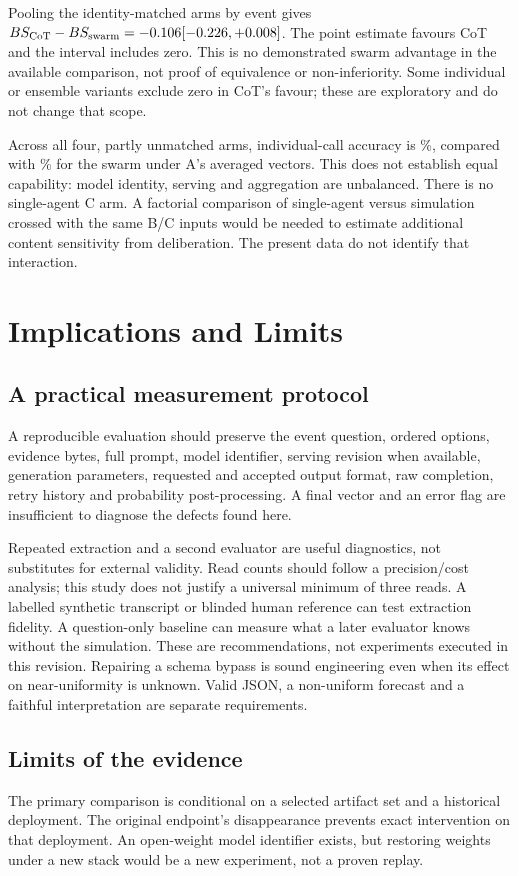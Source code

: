 \documentclass[10pt,conference]{IEEEtran}
\begin{document}
Pooling the identity-matched arms by event gives
$BS_{\rm CoT}-BS_{\rm swarm}=-0.106 [-0.226, +0.008]$. The point estimate favours CoT
and the interval includes zero. This is no demonstrated swarm advantage in
the available comparison, not proof of equivalence or non-inferiority.
Some individual or ensemble variants exclude zero in CoT's favour; these
are exploratory and do not change that scope.

Across all four, partly unmatched arms, individual-call accuracy is
\CotAccuracy\%, compared with \PooledAccuracy\% for the swarm under A's
averaged vectors. This does not establish equal capability: model identity,
serving and aggregation are unbalanced. There is no single-agent C arm.
A factorial comparison of single-agent versus simulation crossed with the
same B/C inputs would be needed to estimate additional content sensitivity
from deliberation. The present data do not identify that interaction.

\section{Implications and Limits}
\label{sec:limitations}
\subsection{A practical measurement protocol}
A reproducible evaluation should preserve the event question, ordered options,
evidence bytes, full prompt, model identifier, serving revision when available,
generation parameters, requested and accepted output format, raw completion,
retry history and probability post-processing. A final vector and an error
flag are insufficient to diagnose the defects found here.

Repeated extraction and a second evaluator are useful diagnostics, not substitutes
for external validity. Read counts should follow a precision/cost analysis;
this study does not justify a universal minimum of three reads. A labelled
synthetic transcript or blinded human reference can test extraction fidelity.
A question-only baseline can measure what a later evaluator knows without
the simulation. These are recommendations, not experiments executed in this
revision. Repairing a schema bypass is sound engineering even when its effect
on near-uniformity is unknown. Valid JSON, a non-uniform forecast and a faithful
interpretation are separate requirements.

\subsection{Limits of the evidence}
The primary comparison is conditional on a selected artifact set and a historical
deployment. The original endpoint's disappearance prevents exact intervention
on that deployment. An open-weight model identifier exists, but restoring
weights under a new stack would be a new experiment, not a proven replay.
\end{document}
